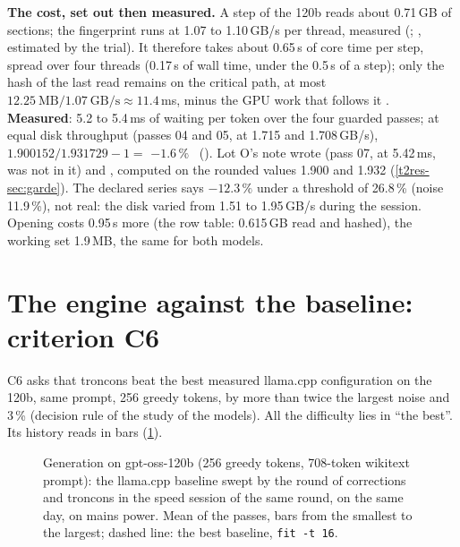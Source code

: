 \textbf{The cost, set out then measured.} A step of the 120b reads about 0.71\,GB of sections; the fingerprint runs at 1.07 to 1.10\,GB/s per thread, measured (; , estimated by the trial). It therefore takes about 0.65\,s of core time per step, spread over four threads (0.17\,s of wall time, under the 0.5\,s of a step); only the hash of the last read remains on the critical path, at most $12.25~\text{MB}/1.07~\text{GB/s} \approx 11.4$\,ms, minus the GPU work that follows it \calc. \textbf{Measured}: 5.2 to 5.4\,ms of waiting per token over the four guarded passes; at equal disk throughput (passes 04 and 05, at 1.715 and 1.708\,GB/s), $1.900152 / 1.931729 - 1 = $ \textbf{$-1.6\,\%$} \mes~(). Lot O's note wrote  (pass 07, at 5.42\,ms, was not in it) and , computed on the rounded values 1.900 and 1.932 (\cref{t2res-sec:garde}). The declared series says $-12.3\,\%$ under a threshold of 26.8\,\% (noise 11.9\,\%), not real: the disk varied from 1.51 to 1.95\,GB/s during the session. Opening costs 0.95\,s more (the row table: 0.615\,GB read and hashed), the working set 1.9\,MB, the same for both models.

\section{The engine against the baseline: criterion C6}\label{sec:t2o-c6}

C6 asks that troncons beat the best measured llama.cpp configuration on the 120b, same prompt, 256 greedy tokens, by more than twice the largest noise and 3\,\% (decision rule of the study of the models). All the difficulty lies in \enquote{the best}. Its history reads in bars (\cref{fig:t2o-vitesse}).

\begin{figure}[ht]
\centering
\GrapheCchVitesse
\caption[troncons against swept llama.cpp]{Generation on gpt-oss-120b (256 greedy tokens, 708-token wikitext prompt): the llama.cpp baseline swept by the round of corrections and troncons in the speed session of the same round, on the same day, on mains power. Mean of the passes, bars from the smallest to the largest; dashed line: the best baseline, \texttt{fit -t 16}.}
\label{fig:t2o-vitesse}
\end{figure}

